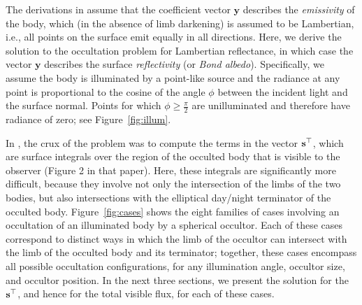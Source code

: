 \documentclass[modern]{aastex62}
\begin{document}
The derivations in \citet{Luger2019} assume that the coefficient vector
$\mathbf{y}$ describes the \emph{emissivity} of the body, which (in the
absence of limb darkening) is assumed to be Lambertian, i.e., all points on the
surface emit equally in all directions.
Here, we derive the solution to the occultation problem for Lambertian
reflectance, in which case the vector $\mathbf{y}$ describes the
surface \emph{reflectivity} (or \emph{Bond albedo}). Specifically, we assume
the body is illuminated by a point-like source and the radiance at any point
is proportional to the cosine of the angle $\phi$ between the incident light
and the surface normal. Points for which $\phi \ge \frac{\pi}{2}$ are
unilluminated and therefore have radiance of zero; see Figure~\ref{fig:illum}.

In \citet{Luger2019}, the crux of the problem was to compute the terms in the
vector ${\mathbf{s}}^\top$, which are surface integrals over
the region of the occulted body that is visible to
the observer (Figure 2 in that paper). Here, these integrals are significantly
more difficult, because they involve not only the intersection of the
limbs of the two bodies, but also intersections with the elliptical
day/night terminator of the occulted body. Figure~\ref{fig:cases} shows the
eight families of cases involving an occultation of an illuminated body by
a spherical occultor. Each of these cases correspond to distinct ways in
which the limb of the occultor can intersect with the limb of the occulted
body and its terminator; together, these cases encompass all possible
occultation configurations, for any illumination angle, occultor size, and
occultor position. In the next three sections, we present the solution for the
${\mathbf{s}}^\top$, and hence for the total visible flux, for each of these cases.

\end{document}
